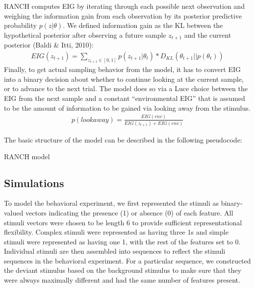 \documentclass[10pt, letterpaper]{article}
\begin{document}
RANCH computes EIG by iterating through each possible next observation
and weighing the information gain from each observation by its posterior
predictive probability \(p(z|\theta)\). We defined information gain as
the KL between the hypothetical posterior after observing a future
sample \(z_{t+1}\) and the current posterior (Baldi \& Itti, 2010):
\begin{eqnarray}
EIG(z_{t+1}) = \sum_{z_{t+1} \in [0,1]} p(z_{t+1}|\theta_t) * D_{KL}(\theta_{t+1} || p(\theta_t))
\end{eqnarray} Finally, to get actual sampling behavior from the model,
it has to convert EIG into a binary decision about whether to continue
looking at the current sample, or to advance to the next trial. The
model does so via a Luce choice between the EIG from the next sample and
a constant ``environmental EIG'' that is assumed to be the amount of
information to be gained via looking away from the stimulus.
\begin{eqnarray}
p(look away) = \frac{EIG(env)}{EIG(z_{t+1})+EIG(env)}
\end{eqnarray}

The basic structure of the model can be described in the following
pseudocode:

\begin{algorithm}
  \caption*{RANCH model}\label{msn}
  \begin{algorithmic}
  \NoDo{}
    \NoThen{}
    \EndIf
    \EndWhile
  \EndFor
\end{algorithmic}
  \end{algorithm}

\hypertarget{simulations}{%
\subsection{Simulations}\label{simulations}}

To model the behavioral experiment, we first represented the stimuli as
binary-valued vectors indicating the presence (1) or absence (0) of each
feature. All stimuli vectors were chosen to be length 6 to provide
sufficient representational flexibility. Complex stimuli were
represented as having three 1s and simple stimuli were represented as
having one 1, with the rest of the features set to 0. Individual stimuli
are then assembled into sequences to reflect the stimuli sequences in
the behavioral experiment. For a particular sequence, we constructed the
deviant stimulus based on the background stimulus to make sure that they
were always maximally different and had the same number of features
present.
\end{document}
